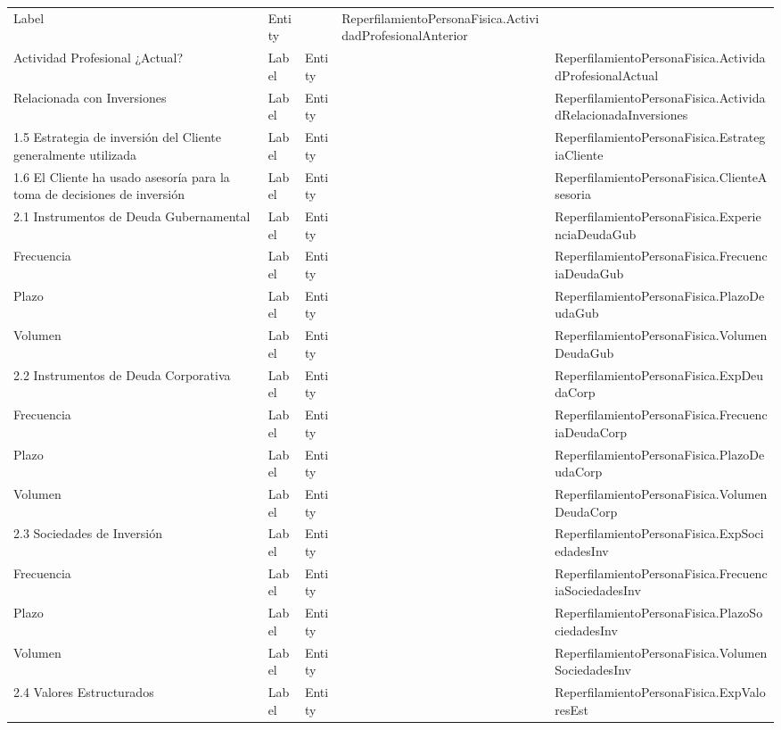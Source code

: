 \begin{table}[H]
{\begin{tabular}{ p{4cm} p{2cm} p{2cm} p{3cm} p{8cm} }
		Label &
		Entity &
		&
		ReperfilamientoPersonaFisica.ActividadProfesionalAnterior \\
		Actividad Profesional ¿Actual? &
		Label &
		Entity &
		&
		ReperfilamientoPersonaFisica.ActividadProfesionalActual \\
		Relacionada con Inversiones &
		Label &
		Entity &
		&
		ReperfilamientoPersonaFisica.ActividadRelacionadaInversiones \\
		1.5 Estrategia de inversi\'on del Cliente generalmente utilizada &
		Label &
		Entity &
		&
		ReperfilamientoPersonaFisica.EstrategiaCliente \\
		1.6 El Cliente ha usado asesor\'ia para la toma de decisiones de inversi\'on &
		Label &
		Entity &
		&
		ReperfilamientoPersonaFisica.ClienteAsesoria \\
		2.1 Instrumentos de Deuda Gubernamental &
		Label &
		Entity &
		&
		ReperfilamientoPersonaFisica.ExperienciaDeudaGub \\
		Frecuencia &
		Label &
		Entity &
		&
		ReperfilamientoPersonaFisica.FrecuenciaDeudaGub \\
		Plazo &
		Label &
		Entity &
		&
		ReperfilamientoPersonaFisica.PlazoDeudaGub \\
		Volumen &
		Label &
		Entity &
		&
		ReperfilamientoPersonaFisica.VolumenDeudaGub \\
		2.2 Instrumentos de Deuda Corporativa &
		Label &
		Entity &
		&
		ReperfilamientoPersonaFisica.ExpDeudaCorp \\
		Frecuencia &
		Label &
		Entity &
		&
		ReperfilamientoPersonaFisica.FrecuenciaDeudaCorp \\
		Plazo &
		Label &
		Entity &
		&
		ReperfilamientoPersonaFisica.PlazoDeudaCorp \\
		Volumen &
		Label &
		Entity &
		&
		ReperfilamientoPersonaFisica.VolumenDeudaCorp \\
		2.3 Sociedades de Inversi\'on &
		Label &
		Entity &
		&
		ReperfilamientoPersonaFisica.ExpSociedadesInv \\
		Frecuencia &
		Label &
		Entity &
		&
		ReperfilamientoPersonaFisica.FrecuenciaSociedadesInv \\
		Plazo &
		Label &
		Entity &
		&
		ReperfilamientoPersonaFisica.PlazoSociedadesInv \\
		Volumen &
		Label &
		Entity &
		&
		ReperfilamientoPersonaFisica.VolumenSociedadesInv \\
		2.4 Valores Estructurados &
		Label &
		Entity &
		&
		ReperfilamientoPersonaFisica.ExpValoresEst \\

\end{tabular}}
\end{table}
